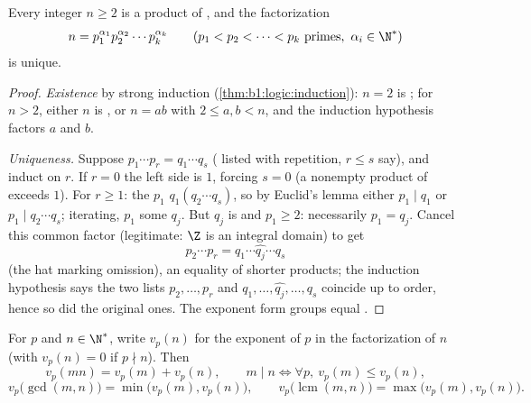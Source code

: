 \begin{theorem}\label{thm:b1:arith:fta}
Every integer $n \geq 2$ is a product of , and the factorization
\[
n = p_1^{\alpha_1} p_2^{\alpha_2} \cdots p_k^{\alpha_k}
\qquad (p_1 < p_2 < \dots < p_k \text{ primes},\ \alpha_i \in \N^*)
\]
is unique.
\end{theorem}

\begin{proof}
\emph{Existence} by strong induction (\cref{thm:b1:logic:induction}):
$n = 2$ is ; for $n > 2$, either $n$ is , or $n = ab$ with
$2 \leq a, b < n$, and the induction hypothesis factors $a$ and $b$.

\emph{Uniqueness.} Suppose $p_1 \cdots p_r = q_1 \cdots q_s$
( listed with repetition, $r \leq s$ say), and induct on
$r$. If $r = 0$ the left side is $1$, forcing $s = 0$ (a nonempty
product of  exceeds $1$). For $r \geq 1$: the  $p_1$
 $q_1(q_2\cdots q_s)$, so by Euclid's lemma either $p_1
\mid q_1$ or $p_1 \mid q_2\cdots q_s$; iterating, $p_1$ 
some $q_j$. But $q_j$ is  and $p_1 \geq 2$: necessarily $p_1
= q_j$. Cancel this common factor (legitimate: $\Z$ is an
integral domain) to get
\[
p_2 \cdots p_r = q_1 \cdots \widehat{q_j} \cdots q_s
\]
(the hat marking omission), an equality of shorter products; the
induction hypothesis says the two lists $p_2, \dots, p_r$ and
$q_1, \dots, \widehat{q_j}, \dots, q_s$ coincide up to order,
hence so did the original ones. The exponent form groups equal
.
\end{proof}

\begin{proposition}[Valuations]\label{prop:b1:arith:valuation}
For $p$  and $n \in \N^*$, write $v_p(n)$ for the exponent of $p$ in the
factorization of $n$ (with $v_p(n) = 0$ if $p \nmid n$). Then
\[
v_p(mn) = v_p(m) + v_p(n),
\qquad
m \mid n \iff \forall p,\ v_p(m) \leq v_p(n),
\]
\[
v_p\bigl(\gcd(m,n)\bigr) = \min\bigl(v_p(m), v_p(n)\bigr),
\qquad
v_p\bigl(\operatorname{lcm}(m,n)\bigr) = \max\bigl(v_p(m),
v_p(n)\bigr).
\]
\end{proposition}

